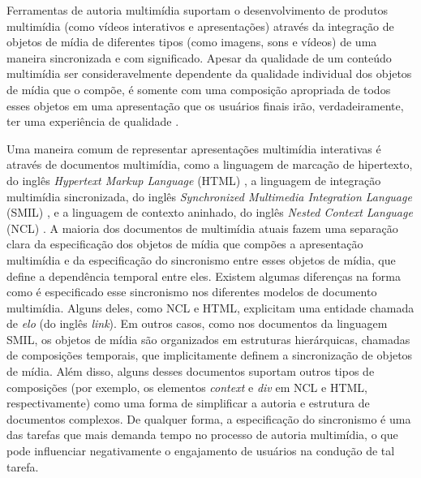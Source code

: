 \documentclass[../main.tex]{subfiles}
\begin{document}


Ferramentas de autoria multimídia suportam o desenvolvimento de produtos multimídia (como vídeos interativos e apresentações) através da integração de objetos de mídia de diferentes tipos (como imagens, sons e vídeos) de uma maneira sincronizada e com significado. Apesar da qualidade de um conteúdo multimídia ser consideravelmente dependente da qualidade individual dos objetos de mídia que o compõe, é somente com uma composição apropriada de todos esses objetos em uma apresentação que os usuários finais irão, verdadeiramente, ter uma experiência de qualidade \cite{pellan2009authoring}. 

Uma maneira comum de representar apresentações multimídia interativas é através de documentos multimídia, como a linguagem de marcação de hipertexto, do inglês \emph{Hypertext Markup Language} (HTML) \cite{graham1995html}, a 
linguagem de integração multimídia sincronizada, do inglês \emph{Synchronized Multimedia Integration Language} (SMIL) \cite{rutledge2001smil}, e a 
linguagem de contexto aninhado, do inglês \emph{Nested Context Language} (NCL) \cite{soares2009programando}. A maioria dos documentos de multimídia atuais fazem uma separação clara da especificação dos objetos de mídia que compões a apresentação multimídia e da especificação do sincronismo entre esses objetos de mídia, que define a dependência temporal entre eles. Existem algumas diferenças na forma como é especificado esse sincronismo nos diferentes modelos de documento multimídia. Alguns deles, como NCL e HTML, explicitam uma entidade chamada de \emph{elo} (do inglês \emph{link}). Em outros casos, como nos documentos da linguagem SMIL, os objetos de mídia são organizados em estruturas hierárquicas, chamadas de composições temporais, que implicitamente definem a sincronização de objetos de mídia. Além disso, alguns desses documentos suportam outros tipos de composições (por exemplo, os elementos \emph{context} e \emph{div} em NCL e HTML, respectivamente) como uma forma de simplificar a autoria e estrutura de documentos complexos. De qualquer forma, a especificação do sincronismo é uma das tarefas que mais demanda tempo no processo de autoria multimídia, o que pode influenciar negativamente o engajamento de usuários na condução de tal tarefa.
\end{document}
